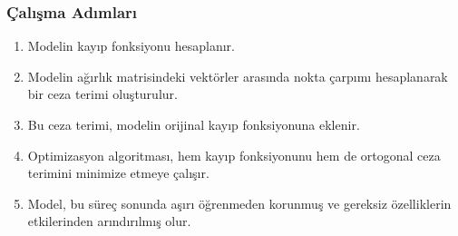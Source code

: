 \subsubsection{Çalışma Adımları}

\begin{enumerate}
    \item Modelin kayıp fonksiyonu hesaplanır.
    \item Modelin ağırlık matrisindeki vektörler arasında nokta çarpımı hesaplanarak bir ceza terimi oluşturulur.
    \item Bu ceza terimi, modelin orijinal kayıp fonksiyonuna eklenir.
    \item Optimizasyon algoritması, hem kayıp fonksiyonunu hem de ortogonal ceza terimini minimize etmeye çalışır.
    \item Model, bu süreç sonunda aşırı öğrenmeden korunmuş ve gereksiz özelliklerin etkilerinden arındırılmış olur.
\end{enumerate}

\newpage